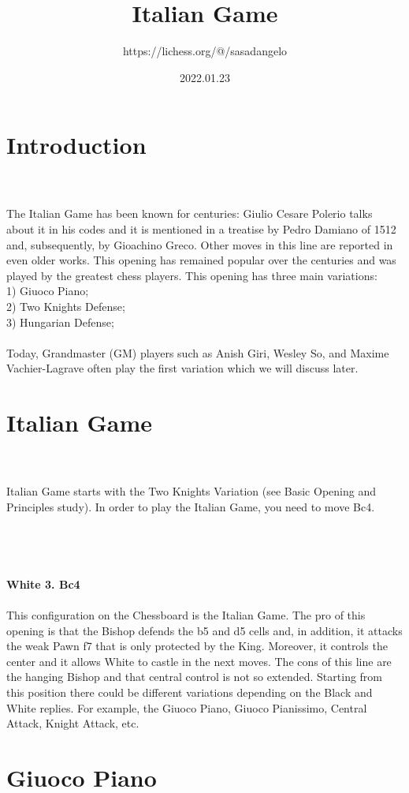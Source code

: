 \documentclass{article}
\title{Italian Game}
\author{https://lichess.org/@/sasadangelo}
\date{2022.01.23}
\begin{document}
\begin{titlepage}
\maketitle
\end{titlepage}
\section{ Introduction}

\\
\\
The Italian Game has been known for centuries: Giulio Cesare Polerio talks about it in his codes and it is mentioned in a treatise by Pedro Damiano of 1512 and, subsequently, by Gioachino Greco. Other moves in this line are reported in even older works. This opening has remained popular over the centuries and was played by the greatest chess players. This opening has three main variations:\\1) Giuoco Piano;\\2) Two Knights Defense;\\3) Hungarian Defense;\\\\Today, Grandmaster (GM) players such as Anish Giri, Wesley So, and Maxime Vachier-Lagrave often play the first variation which we will discuss later.\section{ Italian Game}

\\
\\
Italian Game starts with the Two Knights Variation (see Basic Opening and Principles study). In order to play the Italian Game, you need to move Bc4.\\\\
\\

\\
\\
\textbf{White 3. Bc4}\\
\\
This configuration on the Chessboard is the Italian Game. The pro of this opening is that the Bishop defends the b5 and d5 cells and, in addition, it attacks the weak Pawn f7 that is only protected by the King. Moreover, it controls the center and it allows White to castle in the next moves. The cons of this line are the hanging Bishop and that central control is not so extended. Starting from this position there could be different variations depending on the Black and White replies. For example, the Giuoco Piano, Giuoco Pianissimo, Central Attack, Knight Attack, etc.\\\section{ Giuoco Piano}
\end{document}
